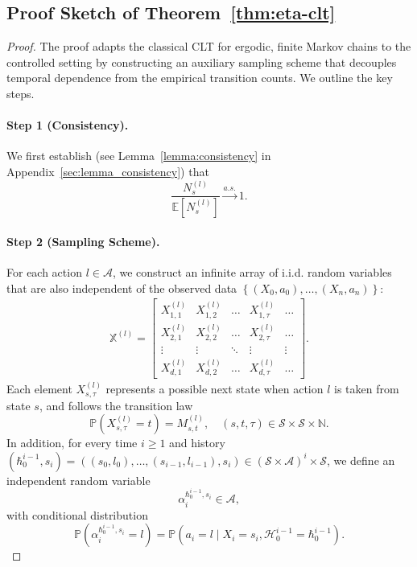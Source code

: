 \documentclass[twoside,11pt]{article}
\newcommand{\pow}[1]{^{(#1)}}%
\numberwithin{equation}{section}
\newcommand{\lp}{\left(}
\newcommand{\rp}{\right)}
\newcommand{\History}{\mathcal{H}}
\newcommand{\history}{\hbar}
\newcommand{\Xbb}{\mathbb{X}}
\newcommand{\indexeddata}{\left\{(X_0,a_0),\dots,(X_n,a_n)\right\}}
\begin{document}
\subsection{Proof Sketch of Theorem~\ref{thm:eta-clt}} 
\begin{proof}
The proof adapts the classical CLT for ergodic, finite Markov chains \citep{billingsley1961statistical} to the controlled setting by constructing an auxiliary sampling scheme that decouples temporal dependence from the empirical transition counts. 
We outline the key steps.

\paragraph{Step 1 (Consistency).}
We first establish (see Lemma~\ref{lemma:consistency} in Appendix~\ref{sec:lemma_consistency}) that
\[
\frac{N_s\pow l}{\mathbb E \left[N_s\pow l \right]} \xrightarrow{a.s.} 1.
\]

\paragraph{Step 2 (Sampling Scheme).}
For each action $l \in \mathcal{A}$, we construct an infinite array of i.i.d. random variables that are also independent of the observed data $\indexeddata$:
\begin{align}
\Xbb^{(l)} = \left[
\begin{array}{ccccc}
X_{1,1}^{(l)} & X_{1,2}^{(l)} & \dots & X_{1,\tau}^{(l)} & \dots \\
X_{2,1}^{(l)} & X_{2,2}^{(l)} & \dots & X_{2,\tau}^{(l)} & \dots \\ 
\vdots & \vdots & \ddots & \vdots & \vdots \\
X_{d,1}^{(l)} & X_{d,2}^{(l)} & \dots & X_{d,\tau}^{(l)} & \dots
\end{array} \right].
\nonumber
\end{align}
Each element $X_{s,\tau}^{(l)}$ represents a possible next state when action $l$ is taken from state $s$, and follows the transition law
\[
\mathbb P \lp X_{s,\tau}^{(l)}=t \rp=M_{s,t}^{(l)}, \quad (s,t,\tau)\in \mathcal{S}\times\mathcal{S}\times\mathbb{N}.
\]
In addition, for every time $i\ge1$ and history $\lp \history_0^{i-1}, s_i\rp = \lp (s_0,l_0),\dots,(s_{i-1},l_{i-1}),s_i \rp \in(\mathcal{S}\times\mathcal{A})^{i}\times\mathcal{S}$, we define an independent random variable
\[
\alpha_i^{\history_0^{i-1}, s_i}\in\mathcal{A},
\]
with conditional distribution
\[
\mathbb P\lp\alpha_i^{\history_0^{i-1}, s_i}=l\rp
= \mathbb P \lp a_i=l \mid X_i=s_i, \History_0^{i-1}=\history_0^{i-1} \rp.
\]


\end{proof}
\end{document}
